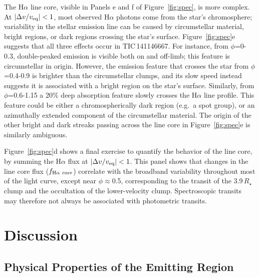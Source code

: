\documentclass[11pt,twocolumn,tighten]{aastex7}
\begin{document}
The H$\alpha$ line core, visible in Panels e and f of
Figure~\ref{fig:spec}, is more complex.  At $|\Delta v / v_{\rm
eq}|<1$, most observed H$\alpha$ photons come from the star's
chromosphere; variability in the stellar emission line can be
caused by circumstellar material, bright regions, or dark regions
crossing the star's surface.  Figure~\ref{fig:spec}e suggests that
all three effects occur in TIC\,141146667.  For instance, from
$\phi$=0-0.3, double-peaked emission is visible both on and off-limb;
this feature is circumstellar in origin.  However, the emission
feature that crosses the star from $\phi$=0.4-0.9 is brighter than the
circumstellar clumps, and its slow speed instead suggests it is
associated with a bright region on the star's surface.  Similarly, from
$\phi$=0.6-1.15 a 20\% deep absorption feature slowly crosses the
H$\alpha$ line profile.  This feature could be either a
chromospherically dark region (e.g.~a spot group), or an azimuthally
extended component of the circumstellar material.  The origin of the
other bright and dark streaks passing across the line core in
Figure~\ref{fig:spec}e is similarly ambiguous. 

Figure~\ref{fig:spec}d shows a final exercise to quantify the
behavior of the line core, by summing the H$\alpha$ flux at
$|\Delta v / v_{\rm eq}|<1$.  This panel shows that changes in the
line core flux ($f_{\rm H\alpha\ core}$) correlate with the
broadband variability throughout most of the light curve, except near
$\phi$$\approx$0.5, corresponding to the transit of the 3.9\,$R_\star$
clump and the occultation of the lower-velocity clump.
Spectroscopic transits may therefore not always be associated
with photometric transits.


\section{Discussion}
\label{sec:disc}

\subsection{Physical Properties of the Emitting Region}

\end{document}
